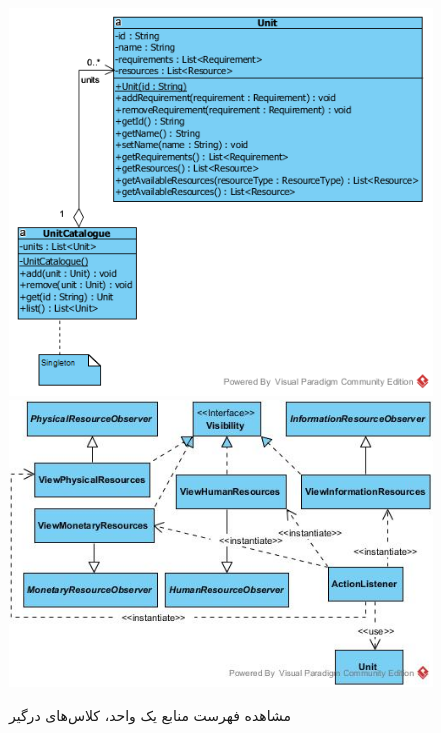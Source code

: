 \begin{landscape}
\begin{figure}[H]
	\includegraphics[scale=0.6]{img/sequence-design/ViewListOfResourcesC}
	\includegraphics[scale=0.7]{img/sequence-design/ViewListOfResourcesUI}
	\caption{مشاهده فهرست منابع یک واحد، کلاس‌های درگیر}
\end{figure}

\newpage

\end{landscape}
